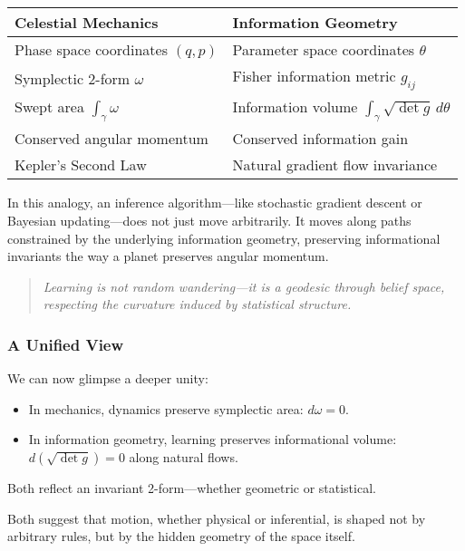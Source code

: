 \begin{tcolorbox}[colback=blue!5!white, colframe=blue!75!black, title={Analogy Table}]
\begin{tabular}{ll}
\textbf{Celestial Mechanics} & \textbf{Information Geometry} \\
\hline
Phase space coordinates $(q,p)$ & Parameter space coordinates $\theta$ \\
Symplectic 2-form $\omega$ & Fisher information metric $g_{ij}$ \\
Swept area $\int_\gamma \omega$ & Information volume $\int_\gamma \sqrt{\det g}\, d\theta$ \\
Conserved angular momentum & Conserved information gain \\
Kepler’s Second Law & Natural gradient flow invariance \\
\end{tabular}
\end{tcolorbox}

In this analogy, an inference algorithm—like stochastic gradient descent or Bayesian updating—does not just move arbitrarily.  
It moves along paths constrained by the underlying information geometry,  
preserving informational invariants the way a planet preserves angular momentum.

\begin{quote}
\textit{Learning is not random wandering—it is a geodesic through belief space,  
respecting the curvature induced by statistical structure.}
\end{quote}

\subsubsection*{A Unified View}

We can now glimpse a deeper unity:

\begin{itemize}
    \item In mechanics, dynamics preserve symplectic area: $d\omega = 0$.
    \item In information geometry, learning preserves informational volume: $d(\sqrt{\det g}) = 0$ along natural flows.
\end{itemize}

Both reflect an invariant 2-form—whether geometric or statistical.

Both suggest that motion, whether physical or inferential,  
is shaped not by arbitrary rules, but by the hidden geometry of the space itself.

